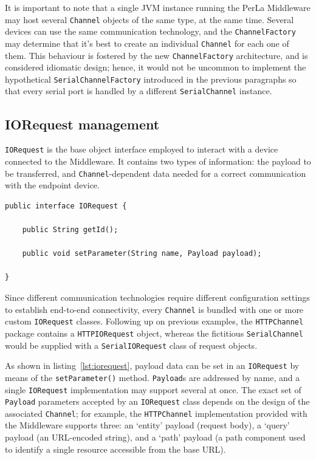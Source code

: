 It is important to note that a single JVM instance running the PerLa Middleware may host several \texttt{Channel} objects of the same type, at the same time. Several devices can use the same communication technology, and the \texttt{ChannelFactory} may determine that it's best to create an individual \texttt{Channel} for each one of them. This behaviour is fostered by the new \texttt{ChannelFactory} architecture, and is considered idiomatic design; hence, it would not be uncommon to implement the hypothetical \texttt{SerialChannelFactory} introduced in the previous paragraphs so that every serial port is handled by a different \texttt{SerialChannel} instance.


\subsection{IORequest management}

\texttt{IORequest} is the base object interface employed to interact with a device connected to the Middleware. It contains two types of information: the payload to be transferred, and \texttt{Channel}-dependent data needed for a correct communication with the endpoint device.

\lstset{language=Java}
\begin{lstlisting}[float,floatplacement=!hbt,caption=The IORequest interface,label={lst:iorequest}]
public interface IORequest {

	public String getId();

	public void setParameter(String name, Payload payload);
	
}
\end{lstlisting}

Since different communication technologies require different configuration settings to establish end-to-end connectivity, every \texttt{Channel} is bundled with one or more custom \texttt{IORequest} classes. Following up on previous examples, the \texttt{HTTPChannel} package contains a \texttt{HTTPIORequest} object, whereas the fictitious \texttt{SerialChannel} would be supplied with a \texttt{SerialIORequest} class of request objects.

As shown in listing~\ref{lst:iorequest}, payload data can be set in an \texttt{IORequest} by means of the \texttt{setParameter()} method. \texttt{Payload}s are addressed by name, and a single \texttt{IORequest} implementation may support several at once. The exact set of \texttt{Payload} parameters accepted by an \texttt{IORequest} class depends on the design of the associated \texttt{Channel}; for example, the \texttt{HTTPChannel} implementation provided with the Middleware supports three: an `entity' payload (request body), a `query' payload (an URL-encoded string), and a `path' payload (a path component used to identify a single resource accessible from the base URL).

